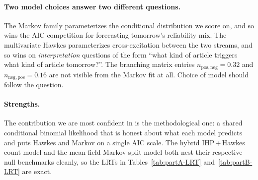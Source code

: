 \documentclass[11pt]{article}
\begin{document}
\paragraph{Two model choices answer two different questions.}
The Markov family parameterizes the conditional distribution we score on,
and so wins the AIC competition for forecasting tomorrow's reliability mix.
The multivariate Hawkes parameterizes cross-excitation between the two
streams, and so wins on \emph{interpretation} questions of the form ``what
kind of article triggers what kind of article tomorrow?''. The branching
matrix entries $n_{\mathrm{pos},\mathrm{neg}}=0.32$ and
$n_{\mathrm{neg},\mathrm{pos}}=0.16$ are not visible from the Markov fit at
all. Choice of model should follow the question.

\paragraph{Strengths.}
The contribution we are most confident in is the methodological one: a
shared conditional binomial likelihood that is honest about what each model
predicts and puts Hawkes and Markov on a single AIC scale. The hybrid
IHP\,+\,Hawkes count model and the mean-field Markov split model both nest
their respective null benchmarks cleanly, so the LRTs in
Tables~\ref{tab:partA-LRT} and~\ref{tab:partB-LRT} are exact.
\end{document}
